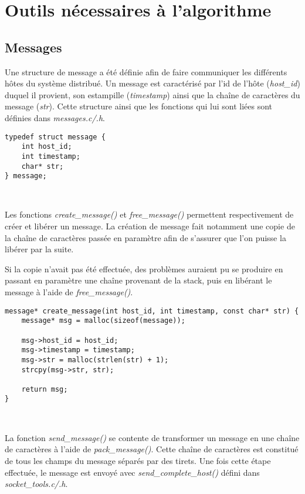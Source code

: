 \section{Outils nécessaires à l'algorithme}
\subsection{Messages}
Une structure de message a été définie afin de faire communiquer les différents hôtes du système distribué. Un message est caractérisé par l'id de l'hôte (\emph{host\_id}) duquel il provient, son estampille (\emph{timestamp}) ainsi que la chaîne de caractères du message (\emph{str}). Cette structure ainsi que les fonctions qui lui sont liées sont définies dans \emph{messages.c/.h}.\\

\begin{lstlisting}
typedef struct message {
	int host_id;
	int timestamp;
	char* str;
} message;
\end{lstlisting}
\

Les fonctions \emph{create\_message()} et \emph{free\_message()} permettent respectivement de créer et libérer un message. La création de message fait notamment une copie de la chaîne de caractères passée en paramètre afin de s'assurer que l'on puisse la libérer par la suite.

\begin{framewarning}
Si la copie n'avait pas été effectuée, des problèmes auraient pu se produire en passant en paramètre une chaîne provenant de la stack, puis en libérant le message à l'aide de \emph{free\_message()}.
\end{framewarning}

\begin{lstlisting}
message* create_message(int host_id, int timestamp, const char* str) {
	message* msg = malloc(sizeof(message));

	msg->host_id = host_id;
	msg->timestamp = timestamp;
	msg->str = malloc(strlen(str) + 1);
	strcpy(msg->str, str);

	return msg;
}
\end{lstlisting}
\

La fonction \emph{send\_message()} se contente de transformer un message en une chaîne de caractères à l'aide de \emph{pack\_message()}. Cette chaîne de caractères est constitué de tous les champs du message séparés par des tirets. Une fois cette étape effectuée, le message est envoyé avec \emph{send\_complete\_host()} défini dans \emph{socket\_tools.c/.h}.\\

